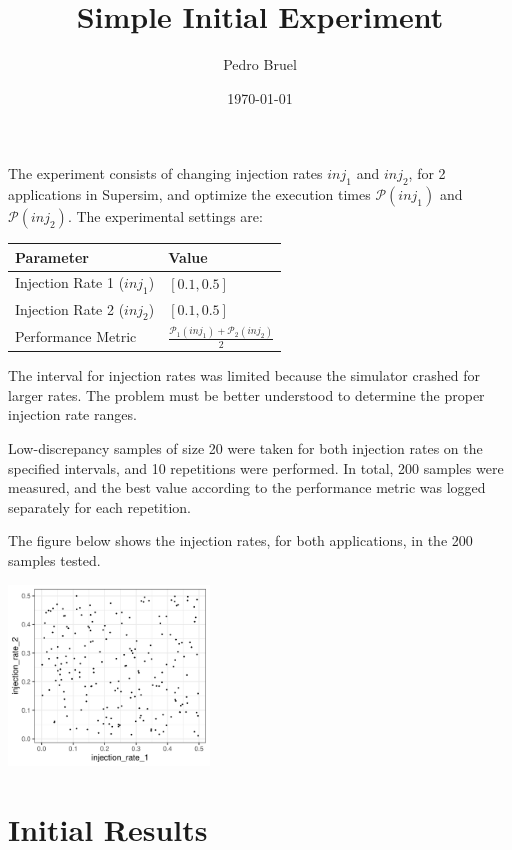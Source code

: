 \documentclass[a4paper]{article}
\author{Pedro Bruel}
\date{\today}
\title{Simple Initial Experiment}
\begin{document}
\maketitle
The experiment  consists of changing  injection rates  \(inj_1\) and \(inj_2\),  for 2
applications in  Supersim, and optimize the  execution times \(\mathcal{P}(inj_1)\)
and \(\mathcal{P}(inj_2)\).  The experimental settings are:

\begin{center}
\begin{tabular}{ll}
\hline
Parameter & Value\\
\hline
Injection Rate 1 (\(inj_1\)) & \([0.1, 0.5]\)\\
Injection Rate 2 (\(inj_2\)) & \([0.1, 0.5]\)\\
Performance Metric & \(\frac{\mathcal{P}_1(inj_1) + \mathcal{P}_2(inj_2)}{2}\)\\
\hline
\end{tabular}
\end{center}

The interval for  injection rates was limited because the  simulator crashed for
larger rates.   The problem must  be better  understood to determine  the proper
injection rate ranges.

Low-discrepancy samples  of size 20 were  taken for both injection  rates on the
specified intervals,  and 10 repetitions  were performed. In total,  200 samples
were measured, and the best value according to the performance metric was logged
separately for each repetition.

The figure  below shows the injection  rates, for both applications,  in the 200
samples tested.

\begin{center}
\includegraphics[width=0.4\textwidth]{./img/2_apps_min_mean_time/rs_20_samples_10_iterations_injection_scatter.pdf}
\end{center}

\section{Initial Results}
\label{sec:org6afd1e3}
\end{document}
